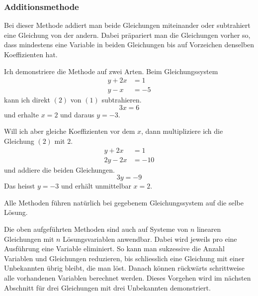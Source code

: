 \documentclass[%
11pt,%
twoside,%
titlepage,%
german,%
headsepline%
]{scrartcl}
\begin{document}
\subsubsection{Additionsmethode}
Bei dieser Methode addiert man beide Gleichungen miteinander oder subtrahiert eine Gleichung von der andern. Dabei pr\"apariert man die Gleichungen vorher so, dass mindestens eine Variable in beiden Gleichungen bis auf Vorzeichen denselben Koeffizienten hat.

Ich demonstriere die Methode auf zwei Arten. Beim Gleichungssystem
\begin{align}
y+2x&=1\tag{1}\\
y-x&=-5\tag{2}
\end{align}
kann ich direkt $(2)$ von $(1)$ subtrahieren.
\begin{equation}
3x=6\tag{$2)-(1$}
\end{equation}
und erhalte $x=2$ und daraus $y=-3$.

Will ich aber gleiche Koeffizienten vor dem $x$, dann multipliziere ich die Gleichung $(2)$ mit $2$.
\begin{align}
y+2x&=1\tag{1}\\
2y-2x&=-10\tag*{$2\cdot(2)$}
\end{align}
und addiere die beiden Gleichungen.
\begin{equation}
3y=-9\tag{$1)+(2$}
\end{equation}
Das heisst $y=-3$ und erh\"alt unmittelbar $x=2$.
\begin{bem}
Alle Methoden f\"uhren nat\"urlich bei gegebenem Gleichungssystem auf die selbe L\"osung.
\end{bem}
\begin{bem}
Die oben aufgef\"uhrten Methoden sind auch auf Systeme von $n$ linearen Gleichungen mit $n$ L\"osungsvariablen anwendbar. Dabei wird jeweils pro eine Ausf\"uhrung eine Variable eliminiert. So kann man sukzessive die Anzahl Variablen und Gleichungen reduzieren, bis schliesslich eine Gleichung mit einer Unbekannten \"ubrig bleibt, die man l\"ost. Danach k\"onnen r\"uckw\"arts schrittweise alle vorhandenen Variablen berechnet werden. Dieses Vorgehen wird im n\"achsten Abschnitt f\"ur drei Gleichungen mit drei Unbekannten demonstriert.
\end{bem}
\end{document}
